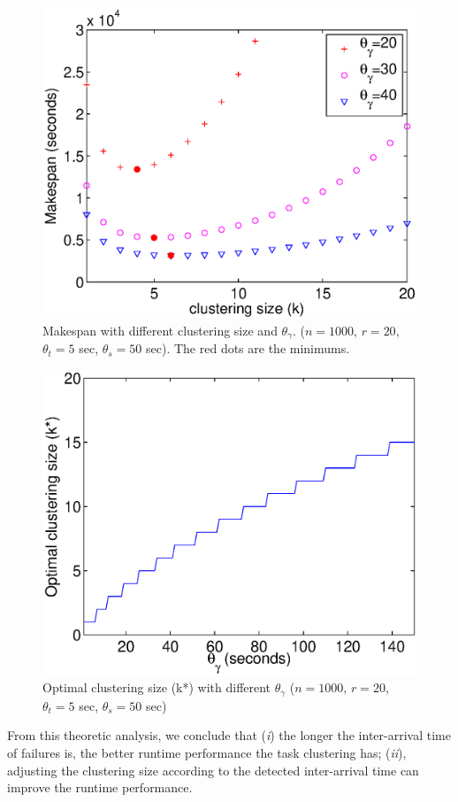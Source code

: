 \begin{figure}[!htb]
\centering
  \includegraphics[width=0.75\linewidth]{figures/tolerance/model_makespan.eps}
  \caption{Makespan with different clustering size and $\theta_{\gamma}$. ($n=1000$, $r=20$, $\theta_t=5$ sec, $\theta_s=50$ sec). The red dots are the minimums. }
  \label{fig:model_makespan}
\end{figure}

\begin{figure}[!htb]
\centering
  \includegraphics[width=0.75\linewidth]{figures/tolerance/model_size.eps}
  \caption{Optimal clustering size (k*) with different  $\theta_{\gamma}$ ($n=1000$, $r=20$, $\theta_t=5$ sec, $\theta_s=50$ sec)}
  \label{fig:model_size}
\end{figure}


From this theoretic analysis, we conclude that (\emph{i}) the longer the inter-arrival time of failures is, the better runtime performance the task clustering has; (\emph{ii}), adjusting the clustering size according to the detected inter-arrival time can improve the runtime performance. 


